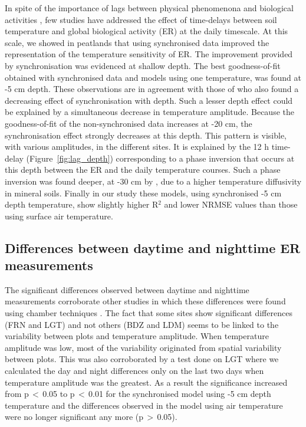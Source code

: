 In spite of the importance of lags between physical phenomenona and biological activities \citep{vargas2010}, few studies have addressed the effect of time-delays between soil temperature and global biological activity (ER) at the daily timescale.
At this scale, we showed in peatlands that using synchronised data improved the representation of the temperature sensitivity of ER.
The improvement provided by synchronisation was evidenced at shallow depth.
The best goodness-of-fit obtained with synchronised data and models using one temperature, was found at -5 cm depth.
These observations are in agreement with those of \citet{pavelka2007} who also found a decreasing effect of synchronisation with depth.
Such a lesser depth effect could be explained by a simultaneous decrease in temperature amplitude.
Because the goodness-of-fit of the non-synchronised data increases at -20 cm, the synchronisation effect  strongly decreases at this depth.
This pattern is visible, with various amplitudes, in the different sites.
It is explained by the 12 h time-delay (Figure~\ref{fig:lag_depth}) corresponding to a phase inversion that occurs at this depth between the ER and the daily temperature courses.
Such a phase inversion was found deeper, at -30 cm by \citet{pavelka2007}, due to a higher temperature diffusivity in mineral soils.
Finally in our study these models, using synchronised -5 cm depth temperature, show slightly higher R$^2$ and lower NRMSE values than those using surface air temperature.

\subsection{Differences between daytime and nighttime ER measurements}

The significant differences observed between daytime and nighttime measurements corroborate other studies in which these differences were found using chamber techniques \citep{juszczak2012,darenova2014}.
The fact that some sites show significant differences (FRN and LGT) and not others (BDZ and LDM) seems to be linked to the variability between plots and temperature amplitude.
When temperature amplitude was low, most of the variability originated from spatial variability between plots.
This was also corroborated by a test done on LGT where we calculated the day and night differences only on the last two days when temperature amplitude was the greatest.
As a result the significance increased from p\,$<$\,0.05 to p\,$<$\,0.01 for the synchronised model using -5 cm depth temperature and the differences observed in the model using air temperature were no longer significant any more (p\,$>$\,0.05).


